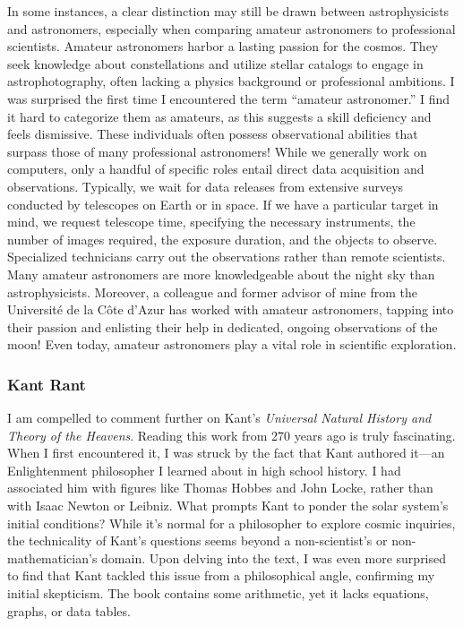 In some instances, a clear distinction may still be drawn between astrophysicists and astronomers, especially when comparing amateur astronomers to professional scientists. Amateur astronomers harbor a lasting passion for the cosmos. They seek knowledge about constellations and utilize stellar catalogs to engage in astrophotography, often lacking a physics background or professional ambitions. I was surprised the first time I encountered the term “amateur astronomer.” I find it hard to categorize them as amateurs, as this suggests a skill deficiency and feels dismissive. These individuals often possess observational abilities that surpass those of many professional astronomers! While we generally work on computers, only a handful of specific roles entail direct data acquisition and observations. Typically, we wait for data releases from extensive surveys conducted by telescopes on Earth or in space. If we have a particular target in mind, we request telescope time, specifying the necessary instruments, the number of images required, the exposure duration, and the objects to observe. Specialized technicians carry out the observations rather than remote scientists. Many amateur astronomers are more knowledgeable about the night sky than astrophysicists. Moreover, a colleague and former advisor of mine from the Université de la Côte d'Azur has worked with amateur astronomers, tapping into their passion and enlisting their help in dedicated, ongoing observations of the moon! Even today, amateur astronomers play a vital role in scientific exploration. 

\subsubsection*{Kant Rant}
I am compelled to comment further on Kant's \textit{Universal Natural History and Theory of the Heavens}. Reading this work from 270 years ago is truly fascinating. When I first encountered it, I was struck by the fact that Kant authored it—an Enlightenment philosopher I learned about in high school history. I had associated him with figures like Thomas Hobbes and John Locke, rather than with Isaac Newton or Leibniz. What prompts Kant to ponder the solar system's initial conditions? While it's normal for a philosopher to explore cosmic inquiries, the technicality of Kant's questions seems beyond a non-scientist's or non-mathematician's domain. Upon delving into the text, I was even more surprised to find that Kant tackled this issue from a philosophical angle, confirming my initial skepticism. The book contains some arithmetic, yet it lacks equations, graphs, or data tables. 

